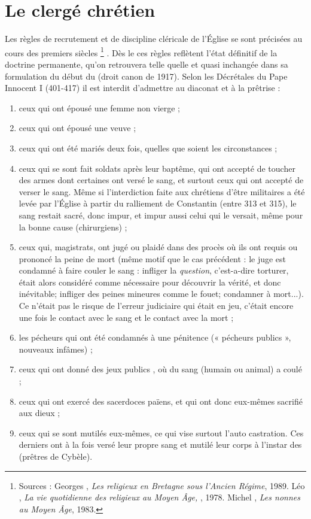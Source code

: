 

\chapter{Le clergé chrétien}


 Les règles de recrutement et de discipline cléricale de l'Église se sont précisées au cours des premiers siècles%
\footnote{Sources : Georges , \emph{Les religieux en Bretagne sous l'Ancien Régime}, 1989. Léo , \emph{La vie quotidienne des religieux au Moyen Âge, }, 1978. Michel , \emph{Les nonnes au Moyen Âge}, 1983.}%
. Dès le  ces règles reflètent l'état définitif de la doctrine permanente, qu'on retrouvera telle quelle et quasi inchangée dans sa formulation du début du  (droit canon de 1917). Selon les Décrétales du Pape Innocent I (401-417) il est interdit d'admettre au diaconat et à la prêtrise :
\begin{enumerate}
\item ceux qui ont épousé une femme non vierge ;
\item ceux qui ont épousé une veuve ;
\item ceux qui ont été mariés deux fois, quelles que soient les circonstances ;
\item ceux qui se sont fait soldats après leur baptême, qui ont accepté de toucher des armes dont certaines ont versé le sang, et surtout ceux qui ont accepté de verser le sang. Même si l'interdiction faite aux chrétiens d'être militaires a été levée par l'Église à partir du ralliement de Constantin (entre 313 et 315), le sang restait sacré, donc impur, et impur aussi celui qui le versait, même pour la bonne cause (chirurgiens) ;
\item ceux qui, magistrats, ont jugé ou plaidé dans des procès où ils ont requis ou prononcé la peine de mort (même motif que le cas précédent : le juge est condamné à faire couler le sang : infliger la \emph{question}, c'est-a-dire torturer, était alors considéré comme nécessaire pour découvrir la vérité, et donc inévitable; infliger des peines mineures comme le fouet; condamner à mort...). Ce n'était pas le risque de l'erreur judiciaire qui était en jeu, c'était encore une fois le contact avec le sang et le contact avec la mort ;
\item les pécheurs qui ont été condamnés à une pénitence (« pécheurs publics », nouveaux infâmes) ;
\item ceux qui ont donné des jeux publics , où du sang (humain ou animal) a coulé ;
\item ceux qui ont exercé des sacerdoces païens, et qui ont donc eux-mêmes sacrifié aux dieux ;
\item ceux qui se sont mutilés eux-mêmes, ce qui vise surtout l'auto castration. Ces derniers ont à la fois versé leur propre sang et mutilé leur corps à l'instar des  (prêtres de Cybèle).
\end{enumerate}


